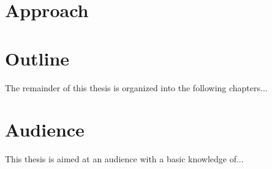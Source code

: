 \section{Approach}

\section{Outline}
The remainder of this thesis is organized into the following chapters...

\section{Audience}
This thesis is aimed at an audience with a basic knowledge of...
